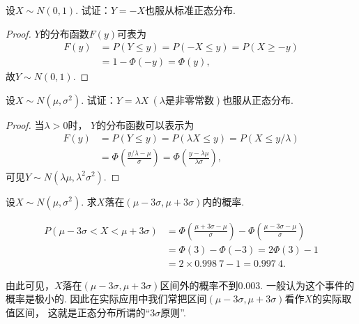 \begin{example}
设\(X \sim N(0,1)\).
试证：\(Y=-X\)也服从标准正态分布.
\begin{proof}
\(Y\)的分布函数\(F(y)\)可表为\begin{align*}
	F(y) &= P(Y \leq y) = P(-X \leq y) = P(X \geq -y) \\
	&= 1 - \Phi(-y) = \Phi(y),
\end{align*}
故\(Y \sim N(0,1)\).
\end{proof}
\end{example}
\begin{example}
设\(X \sim N(\mu,\sigma^2)\).
试证：\(Y=\lambda X\ (\text{$\lambda$是非零常数})\)也服从正态分布.
\begin{proof}
当\(\lambda>0\)时，
\(Y\)的分布函数可以表示为\begin{align*}
	F(y) &= P(Y \leq y)
	= P(\lambda X \leq y)
	= P(X \leq y/\lambda) \\
	&= \Phi\left( \frac{y/\lambda - \mu}{\sigma} \right)
	= \Phi\left( \frac{y - \lambda \mu}{\lambda \sigma} \right),
\end{align*}
可见\(Y \sim N\left( \lambda \mu, \lambda^2 \sigma^2 \right)\).

\end{proof}
\end{example}

\begin{example}
设\(X \sim N(\mu,\sigma^2)\).
求\(X\)落在\((\mu-3\sigma,\mu+3\sigma)\)内的概率.
\begin{solution}
\begin{align*}
	P(\mu-3\sigma<X<\mu+3\sigma)
	&= \Phi\left(\frac{\mu+3\sigma-\mu}{\sigma}\right)
	- \Phi\left(\frac{\mu-3\sigma-\mu}{\sigma}\right) \\
	&= \Phi(3) - \Phi(-3) = 2\Phi(3) - 1 \\
	&= 2 \times 0.998\ 7 - 1 = 0.997\ 4.
\end{align*}
\end{solution}
\end{example}
由此可见，\(X\)落在\((\mu-3\sigma,\mu+3\sigma)\)区间外的概率不到\(0.003\).
一般认为这个事件的概率是极小的.
因此在实际应用中我们常把区间\((\mu-3\sigma,\mu+3\sigma)\)看作\(X\)的实际取值区间，
这就是正态分布所谓的“\(3\sigma\)原则”.

